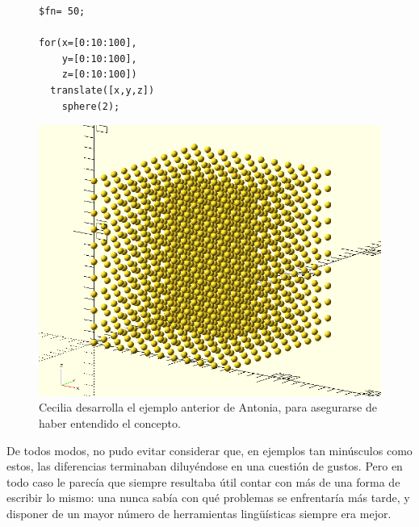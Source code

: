   
  \begin{figure}[ht]    
  \begin{minipage}[]{.5\textwidth}
    \begin{lstlisting}
$fn= 50;

for(x=[0:10:100],
    y=[0:10:100],
    z=[0:10:100])
  translate([x,y,z])
    sphere(2);
\end{lstlisting}%
  \end{minipage}\hfill
     \begin{minipage}[]{.5\textwidth}
       \centering
       \includegraphics[width=.8\textwidth]{imagenes/cubo-de-esferas}
     \end{minipage}
     \caption{Cecilia desarrolla el ejemplo anterior de Antonia, para
       asegurarse de haber entendido el concepto.}
      \label{fig:rangos-2}
    \end{figure}



De todos modos, no pudo evitar considerar que, en ejemplos tan
minúsculos como estos, las diferencias terminaban diluyéndose en una
cuestión de gustos. Pero en todo caso le parecía que siempre resultaba
útil contar con más de una forma de escribir lo mismo: una nunca sabía
con qué problemas se enfrentaría más tarde, y disponer de un mayor
número de herramientas lingüísticas siempre era mejor.


